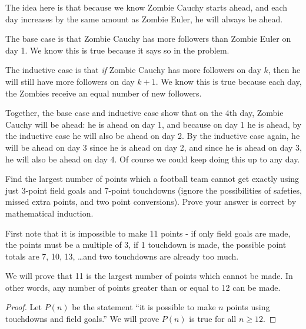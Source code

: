 \documentclass[11pt]{exam}
\begin{document}
\begin{questions}
\begin{solution}
  The idea here is that because we know Zombie Cauchy starts ahead, and each day increases by the same amount as Zombie Euler, he will always be ahead.
  
   The base case is that Zombie Cauchy has more followers than Zombie Euler on day 1.  We know this is true because it says so in the problem.
    
    The inductive case is that {\em if} Zombie Cauchy has more followers on day $k$, then he will still have more followers on day $k+1$.  We know this is true because each day, the Zombies receive an equal number of new followers. 
    
    Together, the base case and inductive case show that on the 4th day, Zombie Cauchy will be ahead: he is ahead on day 1, and because on day 1 he is ahead, by the inductive case he will also be ahead on day 2.  By the inductive case again, he will be ahead on day 3 since he is ahead on day 2, and since he is ahead on day 3, he will also be ahead on day 4.  Of course we could keep doing this up to any day.

\end{solution}




\question[6] Find the largest number of points which a football team cannot get exactly using just 3-point field goals and 7-point touchdowns (ignore the possibilities of safeties, missed extra points, and two point conversions).  Prove your answer is correct by mathematical induction.

\begin{solution}
  First note that it is impossible to make 11 points - if only field goals are made, the points must be a multiple of 3, if 1 touchdown is made, the possible point totals are 7, 10, 13, \ldots and two touchdowns are already too much.
  
  We will prove that 11 is the largest number of points which cannot be made.  In other words, any number of points greater than or equal to 12 can be made.
  
  \begin{proof}
    Let $P(n)$ be the statement ``it is possible to make $n$ points using touchdowns and field goals.''  We will prove $P(n)$ is true for all $n \ge 12$.
    

\end{proof}
\end{solution}
\end{questions}
\end{document}
